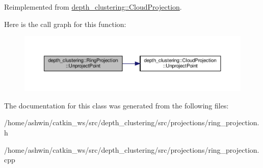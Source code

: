Reimplemented from \hyperlink{classdepth__clustering_1_1CloudProjection_ab552ac1dbb56e077679d9f0268c79a44}{depth\+\_\+clustering\+::\+Cloud\+Projection}.

Here is the call graph for this function\+:\nopagebreak
\begin{figure}[H]
\begin{center}
\leavevmode
\includegraphics[width=350pt]{classdepth__clustering_1_1RingProjection_a16cbf43e541e65560cb282c560b4efa7_cgraph}
\end{center}
\end{figure}


The documentation for this class was generated from the following files\+:\begin{DoxyCompactItemize}
\item 
/home/ashwin/catkin\+\_\+ws/src/depth\+\_\+clustering/src/projections/ring\+\_\+projection.\+h\item 
/home/ashwin/catkin\+\_\+ws/src/depth\+\_\+clustering/src/projections/ring\+\_\+projection.\+cpp\end{DoxyCompactItemize}
